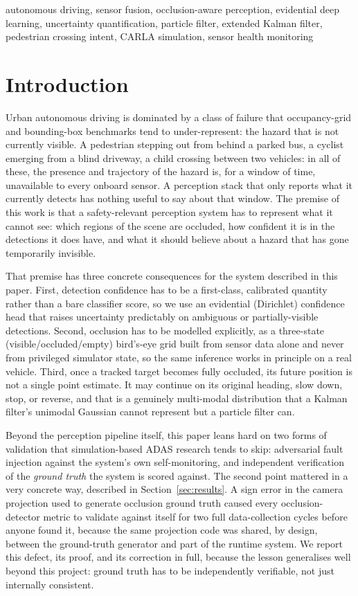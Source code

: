 \documentclass[conference]{IEEEtran}
\begin{document}
\begin{IEEEkeywords}
autonomous driving, sensor fusion, occlusion-aware perception, evidential deep
learning, uncertainty quantification, particle filter, extended Kalman filter,
pedestrian crossing intent, CARLA simulation, sensor health monitoring
\end{IEEEkeywords}

\section{Introduction}

Urban autonomous driving is dominated by a class of failure that
occupancy-grid and bounding-box benchmarks tend to under-represent: the
hazard that is not currently visible. A pedestrian stepping out from
behind a parked bus, a cyclist emerging from a blind driveway, a child
crossing between two vehicles: in all of these, the presence and
trajectory of the hazard is, for a window of time, unavailable to every
onboard sensor. A perception stack that only reports what it currently
detects has nothing useful to say about that window. The premise of
this work is that a safety-relevant perception system has to represent
what it cannot see: which regions of the scene are occluded, how
confident it is in the detections it does have, and what it should
believe about a hazard that has gone temporarily invisible.

That premise has three concrete consequences for the system described
in this paper. First, detection confidence has to be a first-class,
calibrated quantity rather than a bare classifier score, so we use an
evidential (Dirichlet) confidence head that raises uncertainty
predictably on ambiguous or partially-visible detections. Second,
occlusion has to be modelled explicitly, as a three-state
(visible/occluded/empty) bird's-eye grid built from sensor data alone
and never from privileged simulator state, so the same inference works
in principle on a real vehicle. Third, once a tracked target becomes
fully occluded, its future position is not a single point estimate.
It may continue on its original heading, slow down, stop, or reverse,
and that is a genuinely multi-modal distribution that a Kalman filter's
unimodal Gaussian cannot represent but a particle filter can.

Beyond the perception pipeline itself, this paper leans hard on two
forms of validation that simulation-based ADAS research tends to skip:
adversarial fault injection against the system's own self-monitoring,
and independent verification of the \emph{ground truth} the system is
scored against. The second point mattered in a very concrete way,
described in Section~\ref{sec:results}. A sign error in
the camera projection used to generate occlusion ground truth caused
every occlusion-detector metric to validate against itself for two full
data-collection cycles before anyone found it, because the same
projection code was shared, by design, between the ground-truth
generator and part of the runtime system. We report this defect, its
proof, and its correction in full, because the lesson generalises well
beyond this project: ground truth has to be independently verifiable,
not just internally consistent.
\end{document}
